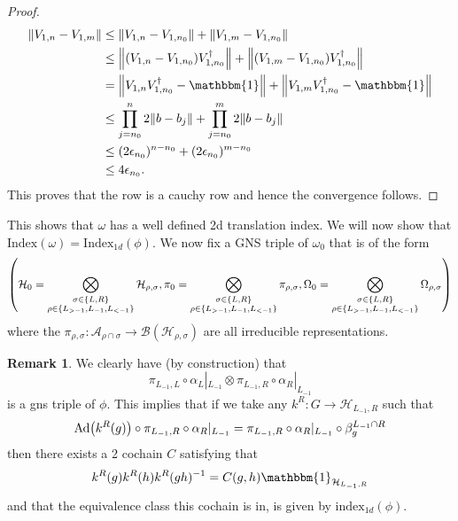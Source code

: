 \documentclass[12pt,a4paper,twoside]{article}
\let\originalleft\left
\let\originalright\right
\renewcommand{\left}{\mathopen{}\mathclose\bgroup\originalleft}
\renewcommand{\right}{\aftergroup\egroup\originalright}
\newcommand{\BB}{\mathcal B}
\newcommand{\HH}{\mathcal H}
\renewcommand{\AA}{\mathcal A}
\newcommand{\id}{\mathbbm{1}}
\newcommand{\Ad}[1]{\textrm{Ad}\left(#1\right)}
\theoremstyle{definition}
\newtheorem{remark}[theorem]{Remark}
\numberwithin{equation}{section}
\begin{document}
\begin{proof}
	\begin{align}
		\norm{V_{1,n}-V_{1,m}}&\leq \norm{V_{1,n}-V_{1,n_0}}+\norm{V_{1,m}-V_{1,n_0}}\\
		&\leq \norm{(V_{1,n}-V_{1,n_0})V_{1,n_0}^\dagger}+\norm{(V_{1,m}-V_{1,n_0})V_{1,n_0}^\dagger}\\
		&=\norm{V_{1,n}V_{1,n_0}^\dagger-\id}+\norm{V_{1,m}V_{1,n_0}^\dagger-\id}\\
		&\leq \prod_{j=n_0}^{n}2\norm{b-b_j}+\prod_{j=n_0}^{m}2\norm{b-b_j}\\
		&\leq (2\epsilon_{n_0})^{n-n_0}+(2\epsilon_{n_0})^{m-n_0}\\
		&\leq 4\epsilon_{n_0}.
	\end{align}
	This proves that the row is a cauchy row and hence the convergence follows.
\end{proof}
This shows that $\omega$ has a well defined 2d translation index. We will now show that $\textrm{Index}(\omega)=\textrm{Index}_{1d}(\phi)$. We now fix a GNS triple of $\omega_0$ that is of the form
\begin{equation}
	\left(\HH_0=\bigotimes_{\substack{\sigma\in\{L,R\}\\ \rho\in\{L_{>-1},L_{-1},L_{<-1}\}}}\HH_{\rho,\sigma},\pi_0=\bigotimes_{\substack{\sigma\in\{L,R\}\\ \rho\in\{L_{>-1},L_{-1},L_{<-1}\}}}\pi_{\rho,\sigma},\Omega_0=\bigotimes_{\substack{\sigma\in\{L,R\}\\ \rho\in\{L_{>-1},L_{-1},L_{<-1}\}}}\Omega_{\rho,\sigma}\right)
\end{equation}
where the $\pi_{\rho,\sigma}:\AA_{\rho\cap\sigma}\rightarrow\BB(\HH_{\rho,\sigma})$ are all irreducible representations.
\begin{remark}\label{rem:GNS_One_Dimensional}
	We clearly have (by construction) that
	\begin{equation}
		\pi_{L_{-1},L}\circ\alpha_L|_{L_{-1}}\otimes \pi_{L_{-1},R}\circ\alpha_R|_{L_{-1}}
	\end{equation}
	is a gns triple of $\phi$. This implies that if we take any $k^R:G\rightarrow \HH_{L_{-1},R}$ such that
	\begin{equation}
		\Ad{k^R(g)}\circ\pi_{L_{-1},R}\circ\alpha_R|_{L_{-1}}=\pi_{L_{-1},R}\circ\alpha_R|_{L_{-1}}\circ\beta_{g}^{L_{-1}\cap R}
	\end{equation}
	then there exists a 2 cochain $C$ satisfying that
	\begin{equation}
		k^R(g)k^R(h)k^R(gh)^{-1}=C(g,h)\id_{\HH_{L_{-1},R}}
	\end{equation}
	and that the equivalence class this cochain is in, is given by $\textrm{index}_{1d}(\phi)$.
\end{remark}
\end{document}
